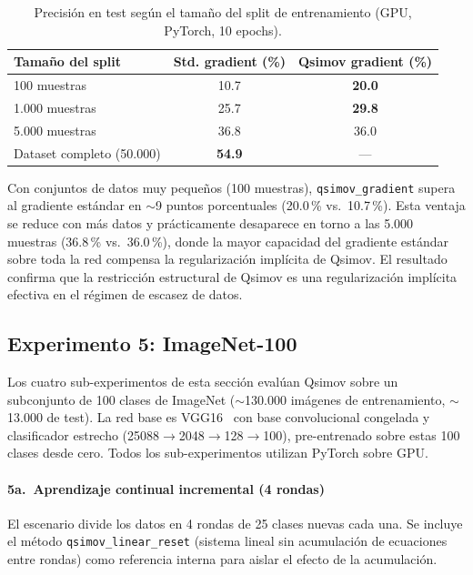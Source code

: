 \begin{table}[htbp]
  \centering
  \caption{Precisión en test según el tamaño del split de entrenamiento (GPU, PyTorch, 10 epochs).}
  \label{tab:tabla5b}
  \small
  \begin{tabular}{p{4cm}cc}
    \toprule
    \textbf{Tamaño del split} & \textbf{Std. gradient (\%)} & \textbf{Qsimov gradient (\%)} \\
    \midrule
    100 muestras              & 10.7          & \textbf{20.0} \\
    1.000 muestras            & 25.7          & \textbf{29.8} \\
    5.000 muestras            & 36.8          & 36.0 \\
    Dataset completo (50.000) & \textbf{54.9} & --- \\
    \bottomrule
  \end{tabular}
\end{table}

Con conjuntos de datos muy pequeños (100 muestras), \texttt{qsimov\_gradient} supera al gradiente
estándar en $\sim$9 puntos porcentuales (20.0\,\% vs.\ 10.7\,\%). Esta ventaja se reduce con más
datos y prácticamente desaparece en torno a las 5.000 muestras (36.8\,\% vs.\ 36.0\,\%), donde la
mayor capacidad del gradiente estándar sobre toda la red compensa la regularización implícita de
Qsimov. El resultado confirma que la restricción estructural de Qsimov es una regularización
implícita efectiva en el régimen de escasez de datos.

\subsection{Experimento 5: ImageNet-100}

Los cuatro sub-experimentos de esta sección evalúan Qsimov sobre un subconjunto de 100 clases de
ImageNet ($\sim$130.000 imágenes de entrenamiento, $\sim$13.000 de test). La red base es
VGG16~\cite{ref19} con base convolucional congelada y clasificador estrecho
(25088$\rightarrow$2048$\rightarrow$128$\rightarrow$100), pre-entrenado sobre estas 100 clases
desde cero. Todos los sub-experimentos utilizan PyTorch sobre GPU.

\paragraph{5a.~Aprendizaje continual incremental (4 rondas)}

El escenario divide los datos en 4 rondas de 25 clases nuevas cada una. Se incluye el método
\texttt{qsimov\_linear\_reset} (sistema lineal sin acumulación de ecuaciones entre rondas) como
referencia interna para aislar el efecto de la acumulación.

